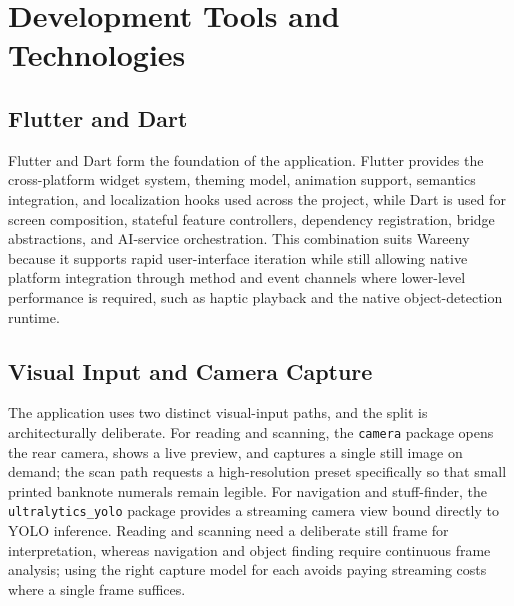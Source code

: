 \documentclass[a4paper]{report}
\begin{document}
\section{Development Tools and Technologies}
\subsection{Flutter and Dart}
Flutter and Dart form the foundation of the application. Flutter provides the cross-platform widget system, theming model, animation support, semantics integration, and localization hooks used across the project, while Dart is used for screen composition, stateful feature controllers, dependency registration, bridge abstractions, and AI-service orchestration. This combination suits Wareeny because it supports rapid user-interface iteration while still allowing native platform integration through method and event channels where lower-level performance is required, such as haptic playback and the native object-detection runtime.

\subsection{Visual Input and Camera Capture}
The application uses two distinct visual-input paths, and the split is architecturally deliberate. For reading and scanning, the \texttt{camera} package opens the rear camera, shows a live preview, and captures a single still image on demand; the scan path requests a high-resolution preset specifically so that small printed banknote numerals remain legible. For navigation and stuff-finder, the \texttt{ultralytics\_yolo} package provides a streaming camera view bound directly to YOLO inference. Reading and scanning need a deliberate still frame for interpretation, whereas navigation and object finding require continuous frame analysis; using the right capture model for each avoids paying streaming costs where a single frame suffices.
\end{document}
